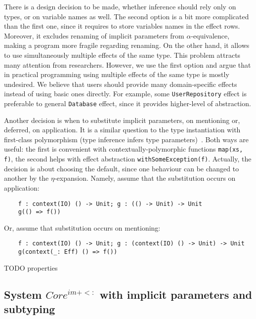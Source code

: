 \documentclass[acmsmall]{acmart}
\begin{document}
There is a design decision to be made, whether inference should rely only on types, or on variable names as well.
The second option is a bit more complicated than the first one, since it requires to store variables names in the effect rows.
Moreover, it excludes renaming of implicit parameters from $\alpha$-equivalence, making a program more fragile regarding renaming.
On the other hand, it allows to use simultaneously multiple effects of the same type.
This problem attracts many attention from researchers. %
However, we use the first option and argue that in practical programming using multiple effects of the same type is mostly undesired.
We believe that users should provide many domain-specific effects instead of using basic ones directly.
For example, some \texttt{UserRepository} effect is preferable to general \texttt{Database} effect, since it provides higher-level of abstraction.

Another decision is when to substitute implicit parameters, on mentioning or, deferred, on application.
It is a similar question to the type instantiation with first-class polymorphism (type inference infers type parameters)~\cite{emrich2020freezeml}. %
Both ways are useful: the first is convenient with contextually-polymorphic functions \texttt{map(xs, f)}, the second helps with effect abstraction \texttt{withSomeException(f)}. %
Actually, the decision is about choosing the default, since one behaviour can be changed to another by the $\eta$-expansion. %
Namely, assume that the substitution occurs on application:
\begin{verbatim}
    f : context(IO) () -> Unit; g : (() -> Unit) -> Unit
    g(() => f())
\end{verbatim}
Or, assume that substitution occurs on mentioning:
\begin{verbatim}
    f : context(IO) () -> Unit; g : (context(IO) () -> Unit) -> Unit
    g(context(_: Eff) () => f())
\end{verbatim}

TODO properties %

\subsection{System $Core^{im+<:}$ with implicit parameters and subtyping} \label{subsec:im-sub}
\end{document}
